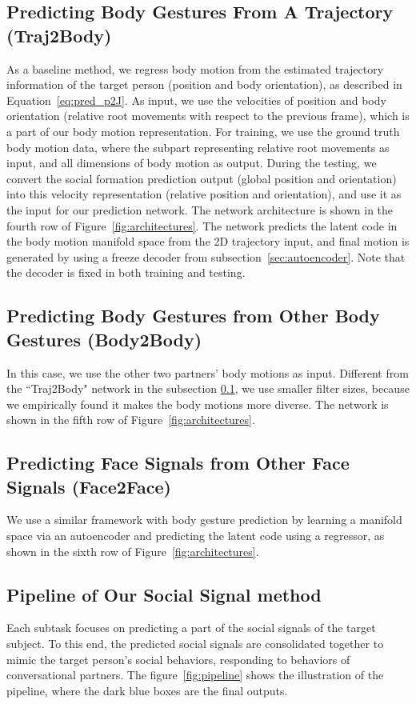 \subsection{Predicting Body Gestures From A Trajectory (Traj2Body)}
\label{sec:traj2body}
As a baseline method, we regress body motion from the estimated trajectory information of the target person (position and body orientation), as described in Equation~\ref{eq:pred_p2J}. As input, we use the velocities of position and body orientation (relative root movements with respect to the previous frame), which is a part of our body motion representation. For training, we use the ground truth body motion data, where the subpart representing relative root movements as input, and all dimensions of body motion as output. During the testing, we convert the social formation prediction output (global position and orientation) into this velocity representation (relative position and orientation), and use it as the input for our prediction network. The network architecture is shown in the fourth row of Figure~\ref{fig:architectures}. The network predicts the latent code in the body motion manifold space from the 2D trajectory input, and final motion is generated by using a freeze decoder from subsection~\ref{sec:autoencoder}. Note that the decoder is fixed in both training and testing. 

\subsection{Predicting Body Gestures from Other Body Gestures (Body2Body)}

In this case, we use the other two partners' body motions as input. Different from the ``Traj2Body" network in the subsection \ref{sec:traj2body}, we use smaller filter sizes, because we empirically found it makes the body motions more diverse. The network is shown in the fifth row of Figure~\ref{fig:architectures}.

\subsection{Predicting Face Signals from Other Face Signals (Face2Face)}

We use a similar framework with body gesture prediction by learning a manifold space via an autoencoder and predicting the latent code using a regressor, as shown in the sixth row of Figure~\ref{fig:architectures}.

\subsection{Pipeline of Our Social Signal method}
Each subtask focuses on predicting a part of the social signals of the target subject.  To this end,  the predicted social signals are consolidated together to mimic the target person's social behaviors, responding to behaviors of conversational partners. The figure~\ref{fig:pipeline} shows the illustration of the pipeline, where the dark blue boxes are the final outputs. 

